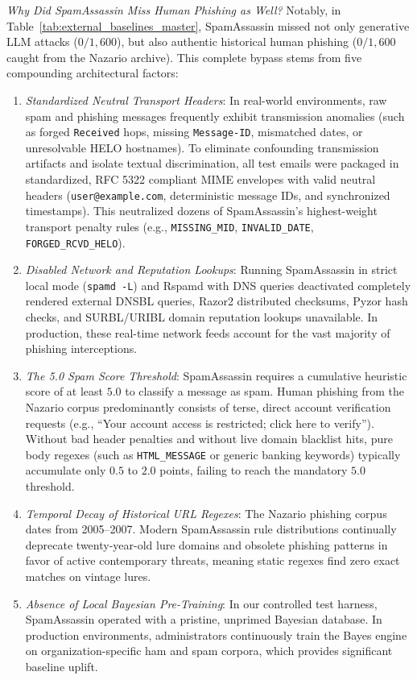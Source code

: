 \documentclass[journal]{IEEEtran}
\begin{document}
\emph{Why Did SpamAssassin Miss Human Phishing as Well?} Notably, in Table~\ref{tab:external_baselines_master}, SpamAssassin missed not only generative LLM attacks ($0 / 1{,}600$), but also authentic historical human phishing ($0 / 1{,}600$ caught from the Nazario archive). This complete bypass stems from five compounding architectural factors:
\begin{enumerate}
    \item \emph{Standardized Neutral Transport Headers}: In real-world environments, raw spam and phishing messages frequently exhibit transmission anomalies (such as forged \texttt{Received} hops, missing \texttt{Message-ID}, mismatched dates, or unresolvable HELO hostnames). To eliminate confounding transmission artifacts and isolate textual discrimination, all test emails were packaged in standardized, RFC 5322 compliant MIME envelopes with valid neutral headers (\texttt{user@example.com}, deterministic message IDs, and synchronized timestamps). This neutralized dozens of SpamAssassin's highest-weight transport penalty rules (e.g., \texttt{MISSING\_MID}, \texttt{INVALID\_DATE}, \texttt{FORGED\_RCVD\_HELO}).
    \item \emph{Disabled Network and Reputation Lookups}: Running SpamAssassin in strict local mode (\texttt{spamd -L}) and Rspamd with DNS queries deactivated completely rendered external DNSBL queries, Razor2 distributed checksums, Pyzor hash checks, and SURBL/URIBL domain reputation lookups unavailable. In production, these real-time network feeds account for the vast majority of phishing interceptions.
    \item \emph{The 5.0 Spam Score Threshold}: SpamAssassin requires a cumulative heuristic score of at least $5.0$ to classify a message as spam. Human phishing from the Nazario corpus predominantly consists of terse, direct account verification requests (e.g., ``Your account access is restricted; click here to verify''). Without bad header penalties and without live domain blacklist hits, pure body regexes (such as \texttt{HTML\_MESSAGE} or generic banking keywords) typically accumulate only $0.5$ to $2.0$ points, failing to reach the mandatory $5.0$ threshold.
    \item \emph{Temporal Decay of Historical URL Regexes}: The Nazario phishing corpus dates from 2005--2007. Modern SpamAssassin rule distributions continually deprecate twenty-year-old lure domains and obsolete phishing patterns in favor of active contemporary threats, meaning static regexes find zero exact matches on vintage lures.
    \item \emph{Absence of Local Bayesian Pre-Training}: In our controlled test harness, SpamAssassin operated with a pristine, unprimed Bayesian database. In production environments, administrators continuously train the Bayes engine on organization-specific ham and spam corpora, which provides significant baseline uplift.
\end{enumerate}
\end{document}
